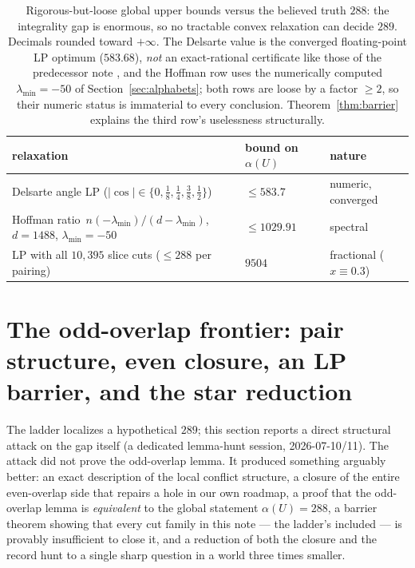 \documentclass[11pt]{article}
\theoremstyle{remark}
\begin{document}
\begin{table}[h]
\centering
\begin{tabular}{@{}lll@{}}
\toprule
relaxation & bound on $\alpha(U)$ & nature \\
\midrule
Delsarte angle LP \cite{DGS75} ($|\cos|\in\{0,\tfrac18,\tfrac14,\tfrac38,\tfrac12\}$) & $\le 583.7$ & numeric, converged \\
Hoffman ratio $\,n(-\lambda_{\min})/(d-\lambda_{\min})$, $d=1488$, $\lambda_{\min}=-50$ & $\le 1029.91$ & spectral \\
LP with all $10{,}395$ slice cuts ($\le288$ per pairing) & $9504$ & fractional ($x\equiv0.3$) \\
\bottomrule
\end{tabular}
\caption{Rigorous-but-loose global upper bounds versus the believed truth
$288$: the integrality gap is enormous, so no tractable convex relaxation
can decide $289$. Decimals rounded toward $+\infty$. The Delsarte value is
the converged floating-point LP optimum ($583.68$), \emph{not} an
exact-rational certificate like those of the predecessor note
\cite{RussellLines26}, and the Hoffman row uses the numerically computed
$\lambda_{\min}=-50$ of Section~\ref{sec:alphabets}; both rows are loose by
a factor $\ge 2$, so their numeric status is immaterial to every
conclusion. Theorem~\ref{thm:barrier} explains the third row's uselessness
structurally.}
\label{tab:loose}
\end{table}

\section{The odd-overlap frontier: pair structure, even closure, an LP
barrier, and the star reduction}\label{sec:odd}

The ladder localizes a hypothetical $289$; this section reports a direct
structural attack on the gap itself (a dedicated lemma-hunt session,
2026-07-10/11). The attack did not prove the odd-overlap lemma. It
produced something arguably better: an exact description of the local
conflict structure, a closure of the entire even-overlap side that repairs
a hole in our own roadmap, a proof that the odd-overlap lemma is
\emph{equivalent} to the global statement $\alpha(U)=288$, a barrier
theorem showing that every cut family in this note --- the ladder's
included --- is provably insufficient to close it, and a reduction of both
the closure and the record hunt to a single sharp question in a world
three times smaller.
\end{document}
